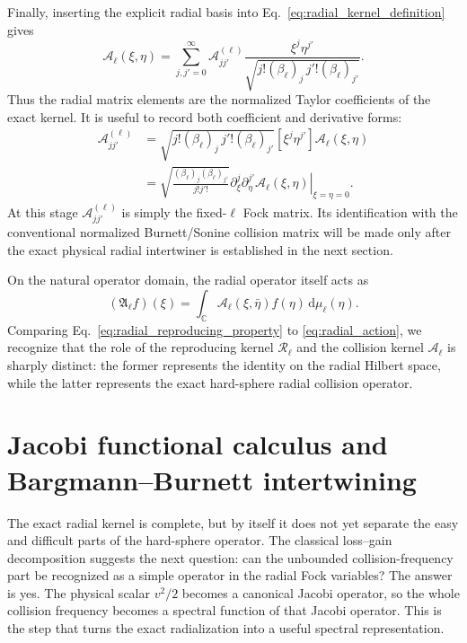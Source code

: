 \documentclass[11pt]{article}
\numberwithin{equation}{section}
\newcommand{\C}{\mathbb C}
\newcommand{\dd}{\,\mathrm d}
\theoremstyle{definition}
\begin{document}
Finally, inserting the explicit radial basis into
Eq.~\eqref{eq:radial_kernel_definition} gives
\begin{equation}
 \boxed{
 \mathscr A_\ell(\xi,\eta)
 =\sum_{j,j'=0}^\infty
 \mathcal A^{(\ell)}_{jj'}
 \frac{\xi^j\eta^{j'}}
 {\sqrt{j!(\beta_\ell)_j\,j'!(\beta_\ell)_{j'}}}.
 }
 \label{eq:radial_generating}
\end{equation}
Thus the radial matrix elements are the normalized Taylor coefficients of the
exact kernel.  It is useful to record both coefficient and derivative forms:
\begin{align}
 \mathcal A^{(\ell)}_{jj'}
 &=\sqrt{j!(\beta_\ell)_j\,j'!(\beta_\ell)_{j'}}
 [\xi^j\eta^{j'}]\mathscr A_\ell(\xi,\eta)
 \label{eq:coefficient_extraction_coefficient}
 \\
 &=\sqrt{\frac{(\beta_\ell)_j(\beta_\ell)_{j'}}{j!j'!}}
 \left.
 \partial_\xi^j\partial_\eta^{j'}\mathscr A_\ell(\xi,\eta)
 \right|_{\xi=\eta=0}.
 \label{eq:coefficient_extraction}
\end{align}
At this stage $\mathcal A^{(\ell)}_{jj'}$ is simply the fixed-$\ell$ Fock
matrix.  Its
identification with the conventional normalized Burnett/Sonine collision
matrix will be made only after the exact physical radial intertwiner is
established in the next section.

On the natural operator domain, the radial operator itself acts as
\begin{equation}
 (\mathfrak A_\ell f)(\xi)
 =\int_{\C}\mathscr A_\ell(\xi,\bar\eta)f(\eta)\dd\mu_\ell(\eta).
 \label{eq:radial_action}
\end{equation}
Comparing Eq.~\eqref{eq:radial_reproducing_property} to \eqref{eq:radial_action}, we recognize that the role of the reproducing kernel $\mathscr R_\ell$ and the collision kernel
$\mathscr A_\ell$ is sharply distinct: the former represents the
identity on the radial Hilbert space, while the latter represents the exact
hard-sphere radial collision operator.

\section{Jacobi functional calculus and Bargmann--Burnett intertwining}
\label{sec:jacobi_intertwining}

The exact radial kernel is complete, but by itself it does not yet separate
the easy and difficult parts of the hard-sphere operator.  The classical
loss--gain decomposition suggests the next question: can the unbounded
collision-frequency part be recognized as a simple operator in the radial
Fock variables?  The answer is yes.  The physical scalar $v^2/2$ becomes a
canonical Jacobi operator, so the whole collision frequency becomes a
spectral function of that Jacobi operator.  This is the step that turns the
exact radialization into a useful spectral representation.
\end{document}
